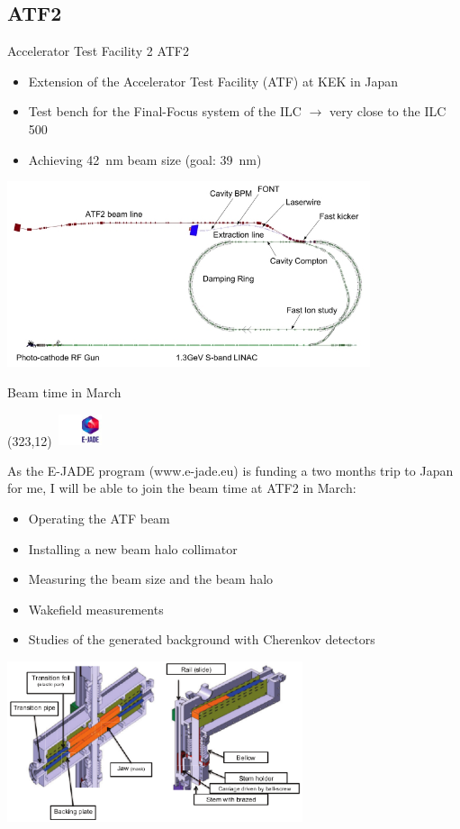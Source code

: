 \documentclass[xcolor={dvipsnames}]{beamer}
\newcommand{\ejadelogo}{
  \setlength{\TPHorizModule}{1pt}
  \setlength{\TPVertModule}{1pt}
  \begin{textblock}{1}(323,12)
   \includegraphics[width=40pt,height=26pt]{figures/EJADE.jpeg}
  \end{textblock}
}
\begin{document}
\subsection{ATF2}
\begin{frame}{Accelerator Test Facility 2}
ATF2
\begin{itemize}
\item Extension of the Accelerator Test Facility (ATF) at KEK in Japan
\item Test bench for the Final-Focus system of the ILC $\rightarrow$ very close to the ILC 500
\item Achieving \SI{42}{\nano\metre} beam size (goal: \SI{39}{\nano\metre})
\end{itemize}
\vspace*{0.3cm}
\begin{center}
 	\includegraphics[width=0.8\textwidth]{figures/ATF.jpg}
\end{center}

\end{frame}

\begin{frame}{Beam time in March}
\ejadelogo
As the E-JADE program {\tiny(www.e-jade.eu)} is funding a two months trip to Japan for me,
I will be able to join the beam time at ATF2 in March:
\begin{itemize}
\item Operating the ATF beam
\item Installing a new beam halo collimator
\item Measuring the beam size and the beam halo
\item Wakefield measurements
\item Studies of the generated background with Cherenkov detectors
\end{itemize}
\begin{center}
\includegraphics[width=0.65\textwidth]{figures/ATF2_beamhalo_collimator.pdf}
\end{center}

\end{frame}
\end{document}
